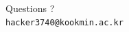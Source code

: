\documentclass[10pt, xcolor=dvipsnames]{beamer}
\begin{document}
%	
%	
	
	\newpage
	{
		\begin{frame}[standout]
			Questions ?\\
			\texttt{hacker3740@kookmin.ac.kr}
		\end{frame}
	}
	
\end{document}
